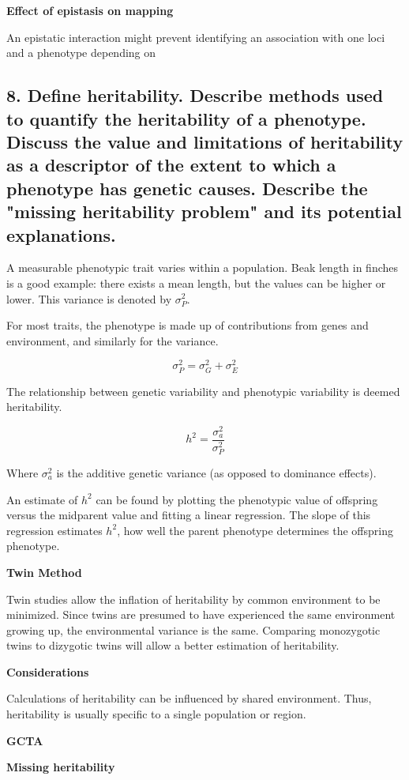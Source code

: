 \documentclass{tufte-handout}
\theoremstyle{noparens}
\begin{document}
\noindent
\textbf{Effect of epistasis on mapping}

An epistatic interaction might prevent identifying an association with one loci and a phenotype depending on 
\newpage
\subsection{8.
Define heritability. Describe methods used to quantify the heritability of a phenotype. Discuss the value and limitations of heritability as a descriptor of the extent to which a phenotype has genetic causes. Describe the "missing heritability problem" and its potential explanations.}
\label{subsec:08}

A measurable phenotypic trait varies within a population. Beak length in finches is a good example: there exists a mean length, but the values can be higher or lower. This variance is denoted by $\sigma_P^2$.

For most traits, the phenotype is made up of contributions from genes and environment, and similarly for the variance.

\[ \sigma_P^2 = \sigma_G^2 + \sigma_E^2 \]

The relationship between genetic variability and phenotypic variability is deemed heritability. 

\[ h^2 = \frac{\sigma_a^2}{\sigma_P^2} \]

Where $\sigma_a^2$ is the additive genetic variance (as opposed to dominance effects).

An estimate of $h^2$ can be found by plotting the phenotypic value of offspring versus the midparent value and fitting a linear regression. The slope of this regression estimates $h^2$, how well the parent phenotype determines the offspring phenotype.

\textbf{Twin Method}

Twin studies allow the inflation of heritability by common environment to be minimized. Since twins are presumed to have experienced the same environment growing up, the environmental variance is the same. Comparing monozygotic twins to dizygotic twins will allow a better estimation of heritability. 

\textbf{Considerations}

Calculations of heritability can be influenced by shared environment. Thus, heritability is usually specific to a single population or region.

\textbf{GCTA}

\textbf{Missing heritability}
\end{document}
